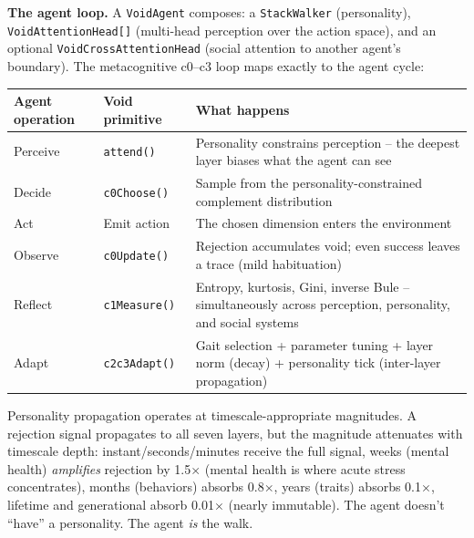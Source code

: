\documentclass[
  11pt,
]{article}
\newcounter{none} %
\begin{document}
\textbf{The agent loop.} A \texttt{VoidAgent} composes: a
\texttt{StackWalker} (personality), \texttt{VoidAttentionHead{[}{]}}
(multi-head perception over the action space), and an optional
\texttt{VoidCrossAttentionHead} (social attention to another agent's
boundary). The metacognitive c0--c3 loop maps exactly to the agent
cycle:

{\def\LTcaptype{none} %
\begin{longtable}[]{@{}
  >{\raggedright\arraybackslash}p{}
  >{\raggedright\arraybackslash}p{}
  >{\raggedright\arraybackslash}p{}@{}}
\toprule\noalign{}
\begin{minipage}[b]{\linewidth}\raggedright
Agent operation
\end{minipage} & \begin{minipage}[b]{\linewidth}\raggedright
Void primitive
\end{minipage} & \begin{minipage}[b]{\linewidth}\raggedright
What happens
\end{minipage} \\
\midrule\noalign{}
\endhead
\bottomrule\noalign{}
\endlastfoot
Perceive & \texttt{attend()} & Personality constrains perception -- the
deepest layer biases what the agent can see \\
Decide & \texttt{c0Choose()} & Sample from the personality-constrained
complement distribution \\
Act & Emit action & The chosen dimension enters the environment \\
Observe & \texttt{c0Update()} & Rejection accumulates void; even success
leaves a trace (mild habituation) \\
Reflect & \texttt{c1Measure()} & Entropy, kurtosis, Gini, inverse Bule
-- simultaneously across perception, personality, and social systems \\
Adapt & \texttt{c2c3Adapt()} & Gait selection + parameter tuning + layer
norm (decay) + personality tick (inter-layer propagation) \\
\end{longtable}
}

Personality propagation operates at timescale-appropriate magnitudes. A
rejection signal propagates to all seven layers, but the magnitude
attenuates with timescale depth: instant/seconds/minutes receive the
full signal, weeks (mental health) \emph{amplifies} rejection by
1.5\(\times\) (mental health is where acute stress concentrates), months
(behaviors) absorbs 0.8\(\times\), years (traits) absorbs 0.1\(\times\),
lifetime and generational absorb 0.01\(\times\) (nearly immutable). The
agent doesn't ``have'' a personality. The agent \emph{is} the walk.
\end{document}
